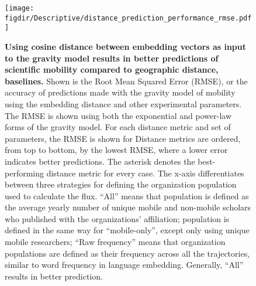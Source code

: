 \documentclass[12pt,a4paper]{article}
\def\figdir{../Figs}
\begin{document}
\clearpage
\begin{figure}[p!]
	\centering
	\texttt{[image: \\figdir/Descriptive/distance\_prediction\_performance\_rmse.pdf]}
	\caption{
		\textbf{Using cosine distance between embedding vectors as input to the gravity model results in better predictions of scientific mobility compared to geographic distance, baselines.}
		Shown is the Root Mean Squared Error (RMSE), or the accuracy of predictions made with the gravity model of mobility using the embedding distance and other experimental parameters.
		The RMSE is shown using both the exponential and power-law forms of the gravity model. 
		For each distance metric and set of parameters, the RMSE is shown for 
		Distance metrics are ordered, from top to bottom, by the lowest RMSE, where a lower error indicates better predictions. 
		The asterisk denotes the best-performing distance metric for every case. 
		The x-axis differentiates between three strategies for defining the organization population used to calculate the flux. 
		``All'' means that population is defined as the average yearly number of unique mobile and non-mobile scholars who published with the organizations' affiliation;
		population is defined in the same way for ``mobile-only'', except only using unique mobile researchers;
		``Raw frequency'' means that organization populations are defined as their frequency across all the trajectories, similar to word frequency in language embedding. 
		Generally, ``All'' results in better prediction.
		}
	\label{fig:supp:distancermse}
\end{figure}


%

\end{document}
